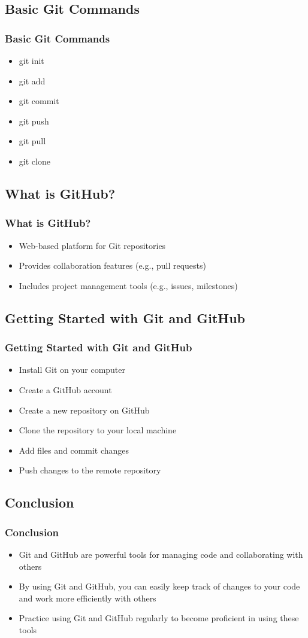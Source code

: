 \documentclass[9pt,table,xcolor=dvipsnames]{beamer}%
\theoremstyle{definition}
\theoremstyle{plain}
\begin{document}
\subsection{Basic Git Commands}
\begin{frame}
  \frametitle{Basic Git Commands}
  \begin{itemize}
    \item git init
    \item git add
    \item git commit
    \item git push
    \item git pull
    \item git clone
  \end{itemize}
\end{frame}
\subsection{What is GitHub?}
\begin{frame}
  \frametitle{What is GitHub?}
  \begin{itemize}
    \item Web-based platform for Git repositories
    \item Provides collaboration features (e.g., pull requests)
    \item Includes project management tools (e.g., issues, milestones)
  \end{itemize}
\end{frame}
\subsection{Getting Started with Git and GitHub}
\begin{frame}
  \frametitle{Getting Started with Git and GitHub}
  \begin{itemize}
    \item Install Git on your computer
    \item Create a GitHub account
    \item Create a new repository on GitHub
    \item Clone the repository to your local machine
    \item Add files and commit changes
    \item Push changes to the remote repository
  \end{itemize}
\end{frame}
\subsection{Conclusion}
\begin{frame}
  \frametitle{Conclusion}
  \begin{itemize}
    \item Git and GitHub are powerful tools for managing code and collaborating with others
    \item By using Git and GitHub, you can easily keep track of changes to your code and work more efficiently with others
    \item Practice using Git and GitHub regularly to become proficient in using these tools
  \end{itemize}
\end{frame}
\end{document}
